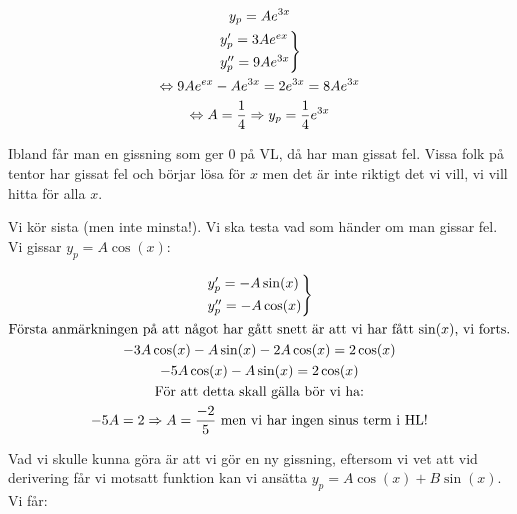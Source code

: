\begin{equation*}
  \begin{gathered}
    y_p = Ae^{3x}\\
    \begin{rcases*}
      y_p^{\prime} = 3Ae^{ex}\\
      y_p^{\prime\prime}=9Ae^{3x}
    \end{rcases*}\\
    \Lrarr 9Ae^{ex}-Ae^{3x}=2e^{3x} = 8Ae^{3x}\\
    \Lrarr A = \dfrac{1}{4} \Rightarrow y_p = \dfrac{1}{4}e^{3x}
  \end{gathered}
\end{equation*}
\par\bigskip
\noindent Ibland får man en gissning som ger 0 på VL, då har man gissat fel. Vissa folk på tentor har gissat fel och börjar lösa för $x$ men det är inte riktigt det vi vill, vi vill hitta för alla $x$.
\par\bigskip
\noindent Vi kör sista (men inte minsta!). Vi ska testa vad som händer om man gissar fel. Vi gissar $y_p = A\cos(x)$:


\begin{equation*}
  \begin{gathered}
    \begin{rcases*}
      y_p^{\prime} = -A\sin(x)\\
      y_p^{\prime\prime}=-A\cos(x)
    \end{rcases*}\\
    \text{Första anmärkningen på att något har gått snett är att vi har fått $\sin(x)$, vi forts.}\\
    -3A\cos(x)-A\sin(x)-2A\cos(x)=2\cos(x)\\
    -5A\cos(x)-A\sin(x)=2\cos(x)\\
    \text{För att detta skall gälla bör vi ha:}\\
    -5A = 2 \Rightarrow A=\dfrac{-2}{5}\text{ men vi har ingen sinus term i HL!}
  \end{gathered}
\end{equation*}
\par\bigskip
\noindent Vad vi skulle kunna göra är att vi gör en ny gissning, eftersom vi vet att vid derivering får vi motsatt funktion kan vi ansätta $y_p = A\cos(x)+B\sin(x)$. Vi får:
\par\bigskip


